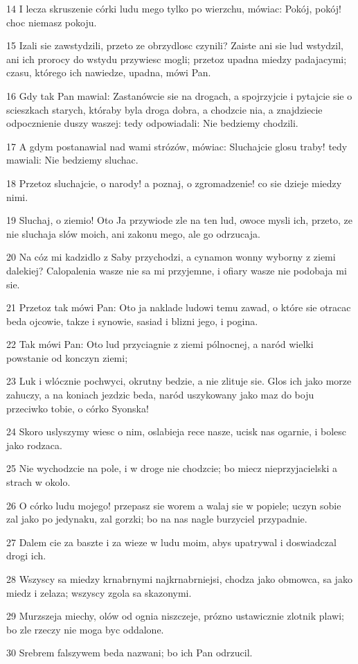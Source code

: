 \par 14 I lecza skruszenie córki ludu mego tylko po wierzchu, mówiac: Pokój, pokój! choc niemasz pokoju.
\par 15 Izali sie zawstydzili, przeto ze obrzydlosc czynili? Zaiste ani sie lud wstydzil, ani ich prorocy do wstydu przywiesc mogli; przetoz upadna miedzy padajacymi; czasu, którego ich nawiedze, upadna, mówi Pan.
\par 16 Gdy tak Pan mawial: Zastanówcie sie na drogach, a spojrzyjcie i pytajcie sie o scieszkach starych, któraby byla droga dobra, a chodzcie nia, a znajdziecie odpocznienie duszy waszej: tedy odpowiadali: Nie bedziemy chodzili.
\par 17 A gdym postanawial nad wami strózów, mówiac: Sluchajcie glosu traby! tedy mawiali: Nie bedziemy sluchac.
\par 18 Przetoz sluchajcie, o narody! a poznaj, o zgromadzenie! co sie dzieje miedzy nimi.
\par 19 Sluchaj, o ziemio! Oto Ja przywiode zle na ten lud, owoce mysli ich, przeto, ze nie sluchaja slów moich, ani zakonu mego, ale go odrzucaja.
\par 20 Na cóz mi kadzidlo z Saby przychodzi, a cynamon wonny wyborny z ziemi dalekiej? Calopalenia wasze nie sa mi przyjemne, i ofiary wasze nie podobaja mi sie.
\par 21 Przetoz tak mówi Pan: Oto ja naklade ludowi temu zawad, o które sie otracac beda ojcowie, takze i synowie, sasiad i blizni jego, i pogina.
\par 22 Tak mówi Pan: Oto lud przyciagnie z ziemi pólnocnej, a naród wielki powstanie od konczyn ziemi;
\par 23 Luk i wlócznie pochwyci, okrutny bedzie, a nie zlituje sie. Glos ich jako morze zahuczy, a na koniach jezdzic beda, naród uszykowany jako maz do boju przeciwko tobie, o córko Syonska!
\par 24 Skoro uslyszymy wiesc o nim, oslabieja rece nasze, ucisk nas ogarnie, i bolesc jako rodzaca.
\par 25 Nie wychodzcie na pole, i w droge nie chodzcie; bo miecz nieprzyjacielski a strach w okolo.
\par 26 O córko ludu mojego! przepasz sie worem a walaj sie w popiele; uczyn sobie zal jako po jedynaku, zal gorzki; bo na nas nagle burzyciel przypadnie.
\par 27 Dalem cie za baszte i za wieze w ludu moim, abys upatrywal i doswiadczal drogi ich.
\par 28 Wszyscy sa miedzy krnabrnymi najkrnabrniejsi, chodza jako obmowca, sa jako miedz i zelaza; wszyscy zgola sa skazonymi.
\par 29 Murzszeja miechy, olów od ognia niszczeje, prózno ustawicznie zlotnik plawi; bo zle rzeczy nie moga byc oddalone.
\par 30 Srebrem falszywem beda nazwani; bo ich Pan odrzucil.

